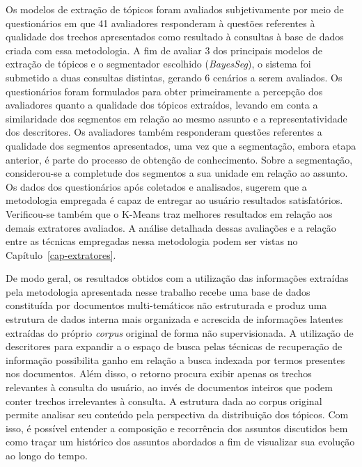 Os modelos de extração de tópicos foram avaliados subjetivamente por meio de questionários em que 41 avaliadores responderam à questões referentes à qualidade dos trechos apresentados como resultado à consultas à base de dados criada com essa metodologia. 
A fim de avaliar 3 dos principais modelos de extração de tópicos e o segmentador escolhido (\textit{BayesSeg}), o sistema foi submetido a duas consultas distintas, gerando 6 cenários a serem avaliados. 
Os questionários foram formulados para obter primeiramente a percepção dos avaliadores quanto a qualidade dos tópicos extraídos, levando em conta a similaridade dos segmentos em relação ao mesmo assunto e a representatividade dos descritores. 
Os avaliadores também responderam questões referentes a qualidade dos segmentos apresentados, uma vez que a segmentação, embora etapa anterior, é parte do processo de obtenção de conhecimento. Sobre a segmentação, considerou-se a completude dos segmentos a sua unidade em relação ao assunto.
Os dados dos questionários após coletados e analisados, sugerem que a metodologia empregada é capaz de entregar ao usuário resultados satisfatórios. Verificou-se também que o K-Means traz melhores resultados em relação aos demais extratores avaliados. 
A análise detalhada dessas avaliações e a relação entre as técnicas empregadas nessa metodologia podem ser vistas no Capítulo~\ref{cap-extratores}.





De modo geral, os resultados obtidos com a utilização das informações extraídas pela metodologia apresentada nesse trabalho recebe uma base de dados constituída por documentos multi-temáticos não estruturada e produz uma estrutura de dados interna mais organizada e acrescida de informações latentes extraídas do próprio \textit{corpus} original de forma não supervisionada. 
A utilização de descritores para expandir a o espaço de busca pelas técnicas de recuperação de informação possibilita ganho em relação a busca indexada por termos presentes nos documentos. Além disso, o retorno procura exibir apenas os trechos relevantes à consulta do usuário, ao invés de documentos inteiros que podem conter trechos irrelevantes à consulta.  
A estrutura dada ao corpus original permite analisar seu conteúdo pela perspectiva da distribuição dos tópicos. Com isso, é possível entender a composição e recorrência dos assuntos discutidos bem como traçar um histórico dos assuntos abordados a fim de visualizar sua evolução ao longo do tempo.


